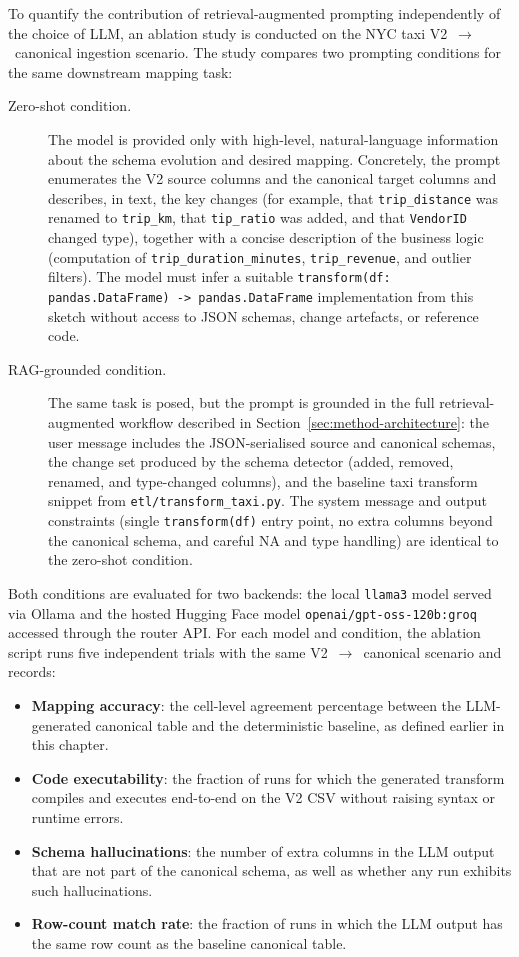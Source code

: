 To quantify the contribution of retrieval-augmented prompting independently of the choice of LLM,
an ablation study is conducted on the NYC taxi V2~$\rightarrow$~canonical ingestion scenario. The
study compares two prompting conditions for the same downstream mapping task:
%
\begin{description}
  \item[Zero-shot condition.] The model is provided only with high-level, natural-language
  information about the schema evolution and desired mapping. Concretely, the prompt enumerates
  the V2 source columns and the canonical target columns and describes, in text, the key changes
  (for example, that \texttt{trip\_distance} was renamed to \texttt{trip\_km}, that
  \texttt{tip\_ratio} was added, and that \texttt{VendorID} changed type), together with a concise
  description of the business logic (computation of \texttt{trip\_duration\_minutes},
  \texttt{trip\_revenue}, and outlier filters). The model must infer a suitable
  \texttt{transform(df: pandas.DataFrame) -> pandas.DataFrame} implementation from this sketch
  without access to JSON schemas, change artefacts, or reference code.
  \item[RAG-grounded condition.] The same task is posed, but the prompt is grounded in the full
  retrieval-augmented workflow described in Section~\ref{sec:method-architecture}: the user
  message includes the JSON-serialised source and canonical schemas, the change set produced by the
  schema detector (added, removed, renamed, and type-changed columns), and the baseline taxi
  transform snippet from \texttt{etl/transform\_taxi.py}. The system message and output
  constraints (single \texttt{transform(df)} entry point, no extra columns beyond the canonical
  schema, and careful NA and type handling) are identical to the zero-shot condition.
\end{description}
%
Both conditions are evaluated for two backends: the local \texttt{llama3} model served via Ollama
and the hosted Hugging Face model \texttt{openai/gpt-oss-120b:groq} accessed through the router
API. For each model and condition, the ablation script runs five independent trials with the same
V2~$\rightarrow$~canonical scenario and records:
%
\begin{itemize}
  \item \textbf{Mapping accuracy}: the cell-level agreement percentage between the LLM-generated
  canonical table and the deterministic baseline, as defined earlier in this chapter.
  \item \textbf{Code executability}: the fraction of runs for which the generated transform
  compiles and executes end-to-end on the V2 CSV without raising syntax or runtime errors.
  \item \textbf{Schema hallucinations}: the number of extra columns in the LLM output that are not
  part of the canonical schema, as well as whether any run exhibits such hallucinations.
  \item \textbf{Row-count match rate}: the fraction of runs in which the LLM output has the same
  row count as the baseline canonical table.
\end{itemize}
